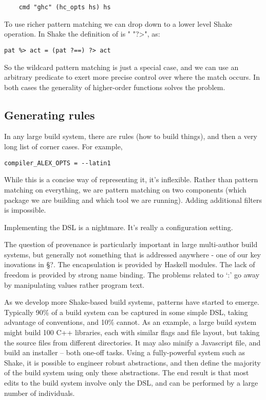 \begin{lstlisting}
    cmd "ghc" (hc_opts hs) hs
\end{lstlisting}
\noindent
To use richer pattern matching we can drop down to a lower level Shake
operation. In Shake the definition of is \lst"%
\lst"?>", as:

\begin{verbatim}
pat %> act = (pat ?==) ?> act
\end{verbatim}
\noindent
So the wildcard pattern matching is just a special case, and we can use an
arbitrary predicate to exert more precise control over where the match occurs.
In both cases the generality of higher-order functions solves the problem.

\subsection{Generating rules}


In any large build system, there are rules (how to build things), and then a
very long list of corner cases. For example,

\begin{lstlisting}
compiler_ALEX_OPTS = --latin1
\end{lstlisting}

While this is a concise way of representing it, it's inflexible. Rather than
pattern matching on everything, we are pattern matching on two components (which
package we are building and which tool we are running). Adding additional
filters is impossible.

Implementing the DSL is a nightmare. It's really a configuration setting.

The question of provenance is particularly important in large multi-author build
systems, but generally not something that is addressed anywhere - one of our key
inovations in \S?. The encapsulation is provided by Haskell modules. The lack of
freedom is provided by strong name binding. The problems related to `:' go away
by manipulating values rather program text.


As we develop more Shake-based build systems, patterns have started to emerge.
Typically 90\% of a build system can be captured in some simple DSL, taking
advantage of conventions, and 10\% cannot. As an example, a large build system
might build 100 C++ libraries, each with similar flags and file layout, but
taking the source files from different directories. It may also minify a
Javascript file, and build an installer -- both one-off tasks. Using a
fully-powerful system such as Shake, it is possible to engineer robust
abstractions, and then define the majority of the build system using only these
abstractions. The end result is that most edits to the build system involve only
the DSL, and can be performed by a large number of individuals.

